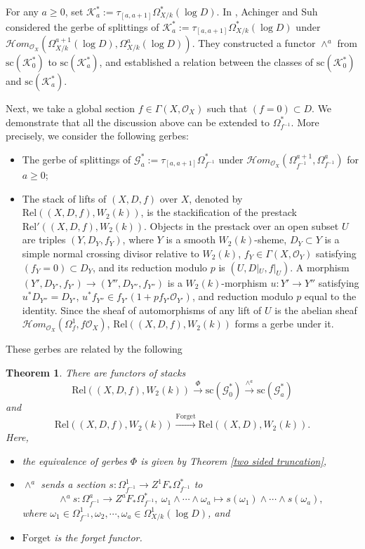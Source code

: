 \documentclass[12pt, a4paper]{article}
\newtheorem{theorem}{Theorem}[section]
\begin{document}
For any $a\geq0$, set $\mathcal K^*_a:=\tau_{[a,a+1]}\Omega^*_{X/k}(\log D)$. In \cite[\S 3]{AS}, Achinger and Suh considered the gerbe of splittings of $\mathcal K^*_a:=\tau_{[a,a+1]}\Omega^*_{X/k}(\log D)$ under $\mathcal Hom_{\mathcal O_X}(\Omega^{a+1}_{X/k}(\log D),\Omega^a_{X/k}(\log D))$.  They constructed a functor $\wedge^a$ from $\mathrm{sc}(\mathcal K^*_0)$ to $\mathrm{sc}(\mathcal K^*_a)$, and established a relation between the classes of $\mathrm{sc}(\mathcal K^*_0)$ and $\mathrm{sc}(\mathcal K^*_a)$.

Next, we take a global section $f\in\Gamma(X,\mathcal O_X)$ such that $(f=0)\subset D$. We demonstrate that all the discussion above can be extended to $\Omega^*_{f^{-1}}$. More precisely, we consider the following  gerbes:
\begin{itemize}

    \item The gerbe of splittings of $\mathcal G_a^*:=\tau_{[a,a+1]}\Omega^*_{f^{-1}}$ under $\mathcal Hom_{\mathcal O_X}(\Omega^{a+1}_{f^{-1}},\Omega^a_{f^{-1}})$ for $a\geq 0$;
    
    \item The stack of lifts of $(X,D,f)$ over $X$, denoted by $\mathrm{Rel}((X,D,f),W_2(k))$, is the stackification of the prestack $\mathrm{Rel}'((X,D,f),W_2(k))$.  Objects in the prestack over an open subset \( U \) are triples \( (Y,D_Y, f_Y) \), where $Y$ is a smooth \( W_2(k) \)-sheme, $D_Y\subset Y$ is a simple normal crossing divisor relative to $W_2(k)$, $f_Y\in\Gamma(X,\mathcal O_Y)$ satisfying $(f_Y=0)\subset D_Y$, and its reduction modulo \( p \) is \( (U,D|_U,f|_U) \). A morphism \( (Y',D_{Y'},f_{Y'}) \to (Y'',D_{Y''},f_{Y''}) \) is a $W_2(k)$-morphism $u:Y'\to Y''$ satisfying $u^*D_{Y''}=D_{Y'}$, $u^*f_{Y''}\in f_{Y'}(1+pf_{Y'}\mathcal O_{Y'})$, and reduction modulo \( p \) equal to the identity. Since the sheaf of automorphisms of any lift of \( U \) is the abelian sheaf \( \mathcal Hom_{\mathcal O_X}(\Omega^1_f,f\mathcal O_X)\), $\mathrm{Rel}((X,D,f),W_2(k))$ forms a gerbe under it.
\end{itemize}
These gerbes are related by the following
\begin{theorem}\label{functors between stacks}
There are functors of stacks
$$
\mathrm{Rel}((X,D,f),W_2(k))\stackrel{\Phi}{\to}\mathrm{sc}(\mathcal G^*_0)\stackrel{\wedge^a}{\to}\mathrm{sc}(\mathcal G^*_a)
$$
and 
$$
\mathrm{Rel}((X,D,f),W_2(k))\xrightarrow{\mathrm{Forget}}\mathrm{Rel}((X,D),W_2(k)).
$$
Here, 
\begin{itemize}
    \item the equivalence of gerbes $\Phi$ is given by Theorem \ref{two sided truncation},
    \item  $\wedge^a$ sends a section $s:\Omega^1_{f^{-1}}\to Z^1F_*\Omega_{f^{-1}}^*$ to
$$
\wedge^as:\Omega^a_{f^{-1}}\to Z^aF_*\Omega^*_{f^{-1}},~\omega_1\wedge\cdots\wedge\omega_a\mapsto s(\omega_1)\wedge\cdots\wedge s(\omega_a),
$$
where $\omega_1\in\Omega^1_{f^{-1}},\omega_2,\cdots,\omega_a\in\Omega^1_{X/k}(\log D)$, and
\item $\mathrm{Forget}$ is the forget functor.
\end{itemize}
\end{theorem} 
\end{document}
